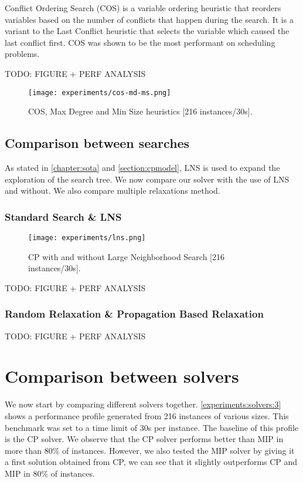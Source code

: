 \documentclass[../../thesis.tex]{subfiles}
\begin{document}
Conflict Ordering Search (COS) \cite{Gay:COS} is a variable ordering heuristic that 
reorders variables based on the number of conflicts that happen during the search.
It is a variant to the Last Conflict heuristic that selects the variable which caused the last conflict first.
COS was shown to be the most performant on scheduling problems.


TODO: FIGURE + PERF ANALYSIS

\begin{figure}
  \centering
  \texttt{[image: experiments/cos-md-ms.png]}
  \caption{COS, Max Degree and Min Size heuristics [216 instances/30s].}
  \label{experiments:heuristics:3}
\end{figure}


\subsection{Comparison between searches}


As stated in \autoref{chapter:sota} and \autoref{section:cpmodel}, LNS is used to expand the exploration
of the search tree. We now compare our solver with the use of LNS and without. We also compare multiple 
relaxations method.


\subsubsection{Standard Search \& LNS}


\begin{figure}
  \centering
  \texttt{[image: experiments/lns.png]}
  \caption{CP with and without Large Neighborhood Search [216 instances/30s].}
  \label{experiments:lns}
\end{figure}

TODO: FIGURE + PERF ANALYSIS


\subsubsection{Random Relaxation \& Propagation Based Relaxation}

TODO: FIGURE + PERF ANALYSIS

\section{Comparison between solvers}

We now start by comparing different solvers together. \autoref{experiments:solvers:3} 
shows a performance profile generated from 216 instances of various sizes.
This benchmark was set to a time limit of 30s per instance. The baseline of this 
profile is the CP solver. We observe that the CP solver performs better than MIP in more than 80\% of instances.
However, we also tested the MIP solver by giving it a first solution obtained from CP, we can see that it slightly outperforms CP and MIP in 80\% of instances.
\end{document}
